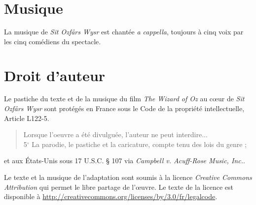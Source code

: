 \section*{Musique}
La musique de \emph{Sit Ozfårs Wysr} est chantée \emph{a cappella}, toujours
à cinq voix par les cinq comédiens du spectacle.
\section*{Droit d'auteur}
Le pastiche du texte et de la musique du film \emph{The Wizard of Oz} au cœur de \emph{Sit Ozfårs Wysr}
sont protégés en France sous le Code de la propriété intellectuelle,
Article L122-5.
\begin{quote}
Lorsque l'oeuvre a été divulguée, l'auteur ne peut interdire...\\
5$^{\circ}$ La parodie, le pastiche et la caricature, compte tenu des lois du
genre ;
\end{quote}
et aux États-Unis sous  17 U.S.C. § 107 via \emph{Campbell v. Acuff-Rose Music,
Inc.}.\par
Le texte et la musique de l'adaptation sont soumis à
la licence \emph{Creative Commons Attribution} qui permet le libre partage
de l'œuvre. Le texte de la licence est
disponible à \url{http://creativecommons.org/licenses/by/3.0/fr/legalcode}.
